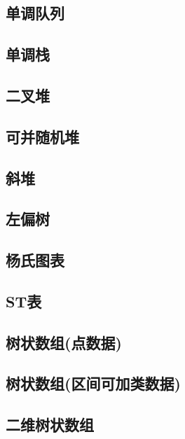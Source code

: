 \documentclass{article}
\begin{document}
\subsection{单调队列} 

\subsection{单调栈} 


\subsection{二叉堆} 

\subsection{可并随机堆} 

\subsection{斜堆} 

\subsection{左偏树} 

\subsection{杨氏图表} 


\subsection{ST表} 


\subsection{树状数组(点数据)} 

\subsection{树状数组(区间可加类数据)} 

\subsection{二维树状数组} 

\end{document}

